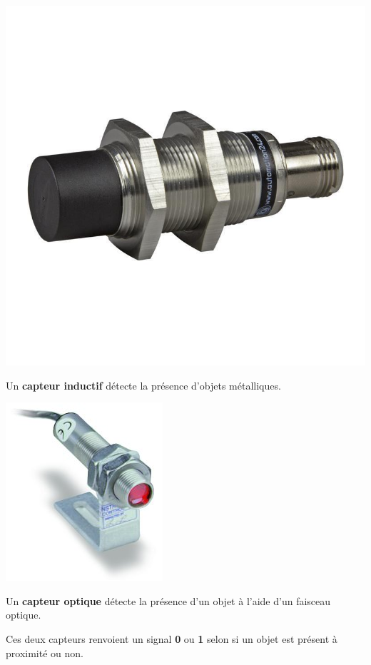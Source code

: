 \pagebreak
\begin{UPSTIactivite}


	 \begin{minipage}[t]{.45\textwidth}
	\begin{center}
		\includegraphics[width=.4\textwidth,height=.4\textheight,keepaspectratio]{images/capt_inductif}
	\end{center}


		Un \textbf{capteur inductif} détecte la présence d'objets métalliques.
	\end{minipage}\hfill
	\begin{minipage}[t]{.45\textwidth}
	\begin{center}
		\includegraphics[width=.4\textwidth,height=.3\textheight,keepaspectratio]{images/capt_optique}
	\end{center}
		Un \textbf{capteur optique} détecte la présence d'un objet à l'aide d'un faisceau optique.
	\end{minipage}

	Ces deux capteurs renvoient un signal \textbf{0} ou \textbf{1} selon si un objet est présent à proximité ou non.




\end{UPSTIactivite}

